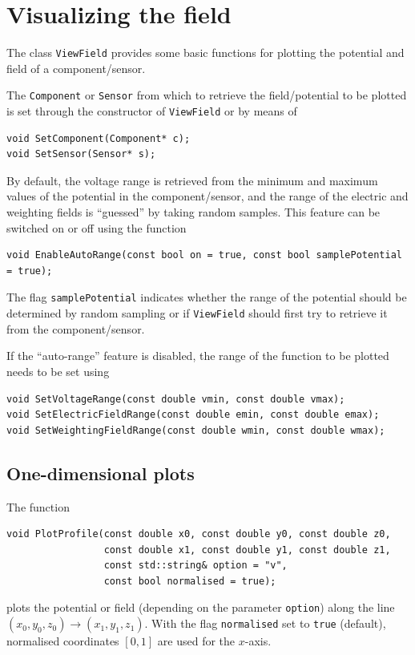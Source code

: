 \section{Visualizing the field}

The class \texttt{ViewField} provides some basic functions 
for plotting the potential and field of a component/sensor.

The \texttt{Component} or \texttt{Sensor} from which to retrieve the 
field/potential to be plotted is set through the constructor of \texttt{ViewField} or by means of
\begin{lstlisting}
void SetComponent(Component* c);
void SetSensor(Sensor* s);
\end{lstlisting}

By default, the voltage range is retrieved from the minimum and maximum 
values of the potential in the component/sensor, and the range of the 
electric and weighting fields is ``guessed'' by taking random samples.
This feature can be switched on or off using the function
\begin{lstlisting}
void EnableAutoRange(const bool on = true, const bool samplePotential = true);
\end{lstlisting}
The flag \texttt{samplePotential} indicates whether the range of the 
potential should be determined by random sampling or if \texttt{ViewField}
should first try to retrieve it from the component/sensor. 

If the ``auto-range'' feature is disabled,
the range of the function to be plotted needs to be set using
\begin{lstlisting}
void SetVoltageRange(const double vmin, const double vmax);
void SetElectricFieldRange(const double emin, const double emax);
void SetWeightingFieldRange(const double wmin, const double wmax);
\end{lstlisting}

\subsection{One-dimensional plots}
The function 
\begin{lstlisting}
void PlotProfile(const double x0, const double y0, const double z0,
                 const double x1, const double y1, const double z1,
                 const std::string& option = "v",
                 const bool normalised = true);
\end{lstlisting}
plots the potential or field (depending on the parameter \texttt{option}) 
along the line  
\(\left(x_{0}, y_{0}, z_{0}\right) \rightarrow 
  \left(x_{1}, y_{1}, z_{1}\right)\).
With the flag \texttt{normalised} set to \texttt{true} (default), 
normalised coordinates $\left[0, 1\right]$ are used for the $x$-axis. 

